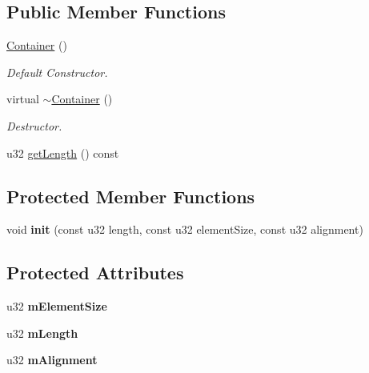 \subsection*{Public Member Functions}
\begin{DoxyCompactItemize}
\item 
\hyperlink{classDE_1_1Container_a21e341b2726d98cd8de87b2804c4b0ea}{Container} ()\hypertarget{classDE_1_1Container_a21e341b2726d98cd8de87b2804c4b0ea}{}\label{classDE_1_1Container_a21e341b2726d98cd8de87b2804c4b0ea}

\begin{DoxyCompactList}\small\item\em Default Constructor. \end{DoxyCompactList}\item 
virtual \hyperlink{classDE_1_1Container_aa22155e6b8843498914f90c38154a1dd}{$\sim$\+Container} ()\hypertarget{classDE_1_1Container_aa22155e6b8843498914f90c38154a1dd}{}\label{classDE_1_1Container_aa22155e6b8843498914f90c38154a1dd}

\begin{DoxyCompactList}\small\item\em Destructor. \end{DoxyCompactList}\item 
u32 \hyperlink{classDE_1_1Container_ac4e1b4aefaecda0e225312fe463c9995}{get\+Length} () const 
\end{DoxyCompactItemize}
\subsection*{Protected Member Functions}
\begin{DoxyCompactItemize}
\item 
void {\bfseries init} (const u32 length, const u32 element\+Size, const u32 alignment)\hypertarget{classDE_1_1Container_a449de30288ea53726ece6268becc9d86}{}\label{classDE_1_1Container_a449de30288ea53726ece6268becc9d86}

\end{DoxyCompactItemize}
\subsection*{Protected Attributes}
\begin{DoxyCompactItemize}
\item 
u32 {\bfseries m\+Element\+Size}\hypertarget{classDE_1_1Container_aa644444a2ab6f47a2f23a24fc3735022}{}\label{classDE_1_1Container_aa644444a2ab6f47a2f23a24fc3735022}

\item 
u32 {\bfseries m\+Length}\hypertarget{classDE_1_1Container_acde96d5b0bd1bd51c64b762b77b81fbb}{}\label{classDE_1_1Container_acde96d5b0bd1bd51c64b762b77b81fbb}

\item 
u32 {\bfseries m\+Alignment}\hypertarget{classDE_1_1Container_af34003e0c91ad31e4d744d3b9f4bb7c1}{}\label{classDE_1_1Container_af34003e0c91ad31e4d744d3b9f4bb7c1}

\end{DoxyCompactItemize}
